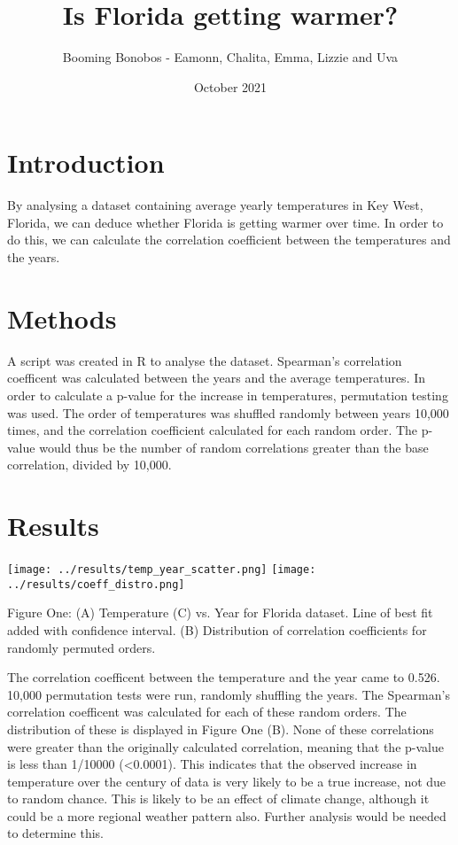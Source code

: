 \documentclass[10pt]{article}
\title{Is Florida getting warmer?}
\author{Booming Bonobos - Eamonn, Chalita, Emma, Lizzie and Uva}
\date{October 2021}
\begin{document}
\maketitle

\thispagestyle{empty}

\section{Introduction}
By analysing a dataset containing average yearly temperatures in Key West, 
Florida, we can deduce whether Florida is getting warmer over time. In order to 
do this, we can calculate the correlation coefficient between the temperatures 
and the years.

\section{Methods}
A script was created in R to analyse the dataset. Spearman's correlation 
coefficent was calculated between the years and the average temperatures. In 
order to calculate a p-value for the increase in temperatures, permutation testing
 was used. The order of temperatures was shuffled randomly between years 10,000 
 times, and the correlation coefficient calculated for each random order. The 
 p-value would thus be the number of random correlations greater than the base 
 correlation, divided by 10,000.

\section{Results}
\begin{center}
    \texttt{[image: ../results/temp\_year\_scatter.png]}
    \texttt{[image: ../results/coeff\_distro.png]}

    Figure One: (A) Temperature (C) vs. Year for Florida dataset. Line of best fit
    added with confidence interval. (B) Distribution of correlation coefficients
    for randomly permuted orders.
\end{center}

The correlation coefficent between the temperature and the year came to 0.526.
10,000 permutation tests were run, randomly shuffling the years. The Spearman's
correlation coefficent was calculated for each of these random orders. The
distribution of these is displayed in Figure One (B). None of these correlations 
were greater than the originally calculated correlation, meaning that the p-value 
is less than 1/10000 (<0.0001). This indicates that the observed increase in 
temperature over the century of data is very likely to be a true increase, not 
due to random chance. This is likely to be an effect of climate change, although
it could be a more regional weather pattern also. Further analysis would be needed 
to determine this.
\end{document}
